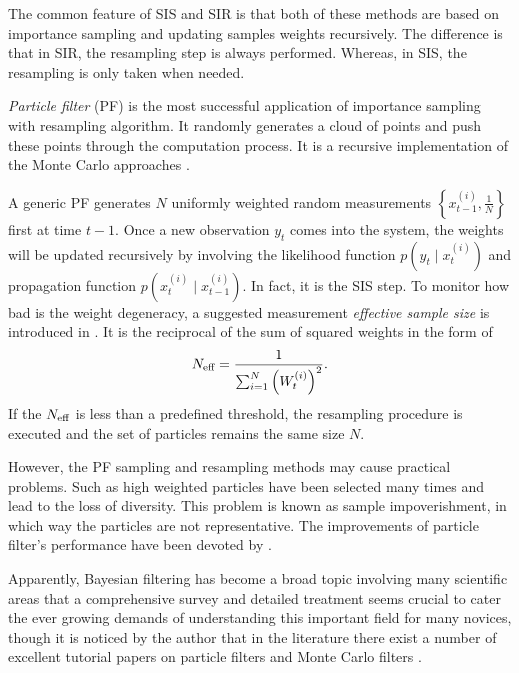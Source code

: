 The common feature of SIS and SIR is that both of these methods are based on importance sampling and updating samples weights recursively. The difference is that in SIR, the resampling step is always performed. Whereas, in SIS, the resampling is only taken when needed. 


\textit{Particle filter} (PF) is the most successful application of importance sampling with resampling algorithm. It randomly generates a cloud of points and push these points through the computation process. It is a recursive implementation of the Monte Carlo approaches \citep{doucet2009tutorial}. 


A generic PF generates $N$ uniformly weighted random measurements $\left\lbrace x_{t-1}^{(i)},\frac{1}{N} \right\rbrace$ first at time $t-1$. Once a new observation $y_t$ comes into the system, the weights will be updated recursively by involving the likelihood function $p(y_t\mid x_t^{(i)})$ and propagation function $p(x_t^{(i)}\mid x_{t-1}^{(i)})$. In fact, it is the SIS step. To monitor how bad is the weight degeneracy, a suggested measurement \textit{effective sample size} is introduced in \citep{kong1994sequential}. It is the reciprocal of the sum of squared weights in the form of 
\begin{equation*}
N_{\mbox{\scriptsize eff}} = \frac{1}{\sum_{i=1}^{N}\left(W_t^{(i)} \right)^2}. 
\end{equation*}
If the $N_{\mbox{\scriptsize eff}}$ is less than a predefined threshold, the resampling procedure is executed and the set of particles remains the same size $N$. 



However, the PF sampling and resampling methods may cause practical problems. Such as high weighted particles have been selected many times and lead to the loss of diversity. This problem is known as sample impoverishment, in which way the particles are not representative. The improvements of particle filter's performance have been devoted by \citep{carpenter1999improved, godsill2001maximum, stavropoulos2001improved, smcmip2011}. 


Apparently, Bayesian filtering has become a broad topic involving many scientific areas that a comprehensive survey and detailed treatment seems crucial to cater the ever growing demands of understanding this important field for many novices, though it is noticed by the author that in the literature there exist a number of excellent tutorial papers on particle filters and Monte Carlo filters \citep{chen2003bayesian, doucet2000sequential, chen2012monte, doucet2000rao}.
 



